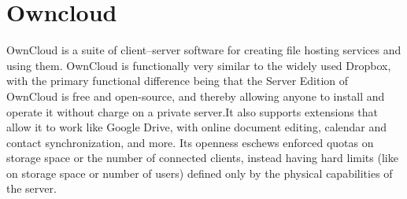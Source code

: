 \section{Owncloud}
OwnCloud is a suite of client–server software for creating file hosting services and using them. OwnCloud is functionally very similar to the widely used Dropbox, with the primary functional difference being that the Server Edition of OwnCloud is free and open-source, and thereby allowing anyone to install and operate it without charge on a private server.It also supports extensions that allow it to work like Google Drive, with online document editing, calendar and contact synchronization, and more. Its openness eschews enforced quotas on storage space or the number of connected clients, instead having hard limits (like on storage space or number of users) defined only by the physical capabilities of the server.\cite{Owncloud}